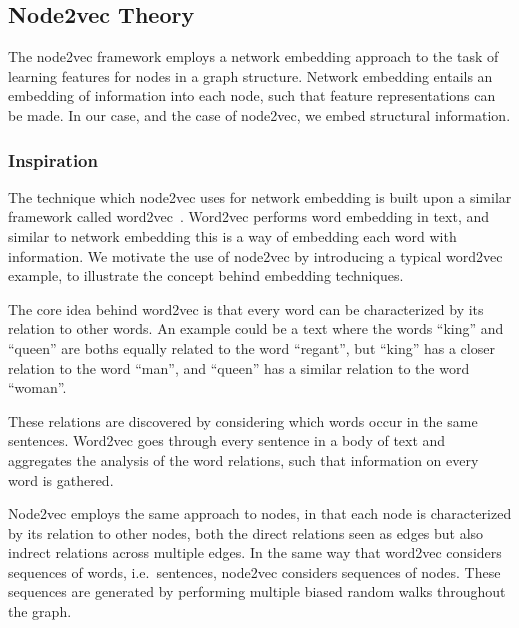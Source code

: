 \subsection{Node2vec Theory}\label{sec:node2vec}
The node2vec framework employs a network embedding approach to the task of learning features for nodes in a graph structure. Network embedding entails an embedding of information into each node, such that feature representations can be made. In our case, and the case of node2vec, we embed structural information.

\subsubsection{Inspiration}
The technique which node2vec uses for network embedding is built upon a similar framework called word2vec~\cite{word2vec}. Word2vec performs word embedding in text, and similar to network embedding this is a way of embedding each word with information. We motivate the use of node2vec by introducing a typical word2vec example, to illustrate the concept behind embedding techniques.

The core idea behind word2vec is that every word can be characterized by its relation to other words. An example could be a text where the words \enquote{king} and \enquote{queen} are boths equally related to the word \enquote{regant}, but \enquote{king} has a closer relation to the word \enquote{man}, and \enquote{queen} has a similar relation to the word \enquote{woman}.

These relations are discovered by considering which words occur in the same sentences. Word2vec goes through every sentence in a body of text and aggregates the analysis of the word relations, such that information on every word is gathered.

Node2vec employs the same approach to nodes, in that each node is characterized by its relation to other nodes, both the direct relations seen as edges but also indrect relations across multiple edges.
In the same way that word2vec considers sequences of words, i.e.\ sentences, node2vec considers sequences of nodes. These sequences are generated by performing multiple biased random walks throughout the graph.


